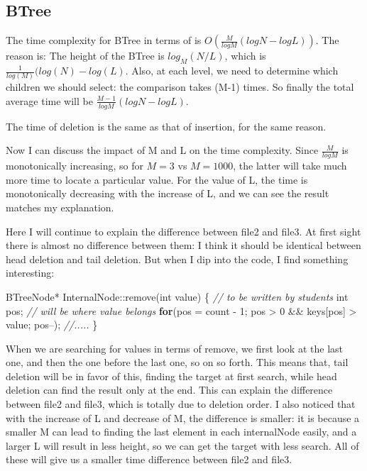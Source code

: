 \documentclass[]{article}
\newenvironment{Shaded}{\begin{snugshade}}{\end{snugshade}}
\newcommand{\KeywordTok}[1]{\textcolor[rgb]{0.13,0.29,0.53}{\textbf{{#1}}}}
\newcommand{\DataTypeTok}[1]{\textcolor[rgb]{0.13,0.29,0.53}{{#1}}}
\newcommand{\DecValTok}[1]{\textcolor[rgb]{0.00,0.00,0.81}{{#1}}}
\newcommand{\CommentTok}[1]{\textcolor[rgb]{0.56,0.35,0.01}{\textit{{#1}}}}
\newcommand{\NormalTok}[1]{{#1}}
\begin{document}
\subsection{BTree}\label{btree}

The time complexity for BTree in terms of is
\(O(\frac{M}{logM}(logN-logL))\). The reason is: The height of the BTree
is \(log_M(N/L)\), which is \(\frac{1}{log(M)}(log(N)-log(L)\). Also, at
each level, we need to determine which children we should select: the
comparison takes (M-1) times. So finally the total average time will be
\(\frac{M-1}{logM}(logN-logL)\).

The time of deletion is the same as that of insertion, for the same
reason.

Now I can discuss the impact of M and L on the time complexity. Since
\(\frac{M}{logM}\) is monotonically increasing, so for \(M = 3\) vs
\(M = 1000\), the latter will take much more time to locate a particular
value. For the value of L, the time is monotonically decreasing with the
increase of L, and we can see the result matches my explanation.

Here I will continue to explain the difference between file2 and file3.
At first sight there is almost no difference between them: I think it
should be identical between head deletion and tail deletion. But when I
dip into the code, I find something interesting:

\begin{Shaded}
\begin{Highlighting}[]
\NormalTok{BTreeNode* InternalNode::remove(}\DataTypeTok{int} \NormalTok{value)}
\NormalTok{\{  }\CommentTok{// to be written by students}
  \DataTypeTok{int} \NormalTok{pos; }\CommentTok{// will be where value belongs}
  \KeywordTok{for}\NormalTok{(pos = count - }\DecValTok{1}\NormalTok{; pos > }\DecValTok{0} \NormalTok{&& keys[pos] > value; pos--);}
  \CommentTok{//.....}
\NormalTok{\}}
\end{Highlighting}
\end{Shaded}

When we are searching for values in terms of remove, we first look at
the last one, and then the one before the last one, so on so forth. This
means that, tail deletion will be in favor of this, finding the target
at first search, while head deletion can find the result only at the
end. This can explain the difference between file2 and file3, which is
totally due to deletion order. I also noticed that with the increase of
L and decrease of M, the difference is smaller: it is because a smaller
M can lead to finding the last element in each internalNode easily, and
a larger L will result in less height, so we can get the target with
less search. All of these will give us a smaller time difference between
file2 and file3.
\end{document}
